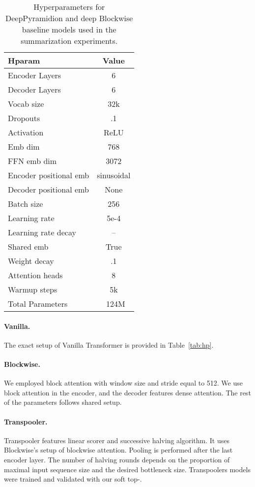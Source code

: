 \documentclass{article}
\begin{document}
{\begin{table}
\caption{Hyperparameters for DeepPyramidion and deep Blockwise baseline models used in the summarization experiments.}
\label{tab:hp_deep}
\centering
\begin{tabular}{lc}
    \toprule
    Hparam & Value \\
    \midrule
    Encoder Layers & 6 \\
    Decoder Layers & 6 \\
    Vocab size & 32k \\
    Dropouts  & .1    \\
    Activation & ReLU \\
    Emb dim & 768 \\
    FFN emb dim & 3072  \\
    Encoder positional emb & sinusoidal \\
    Decoder positional emb & None \\
    Batch size          & 256 \\
    Learning rate       & 5e-4 \\
    Learning rate decay & -- \\
    Shared emb & True \\
    Weight decay        & .1 \\
    Attention heads & 8 \\
    Warmup steps & 5k \\
    Total Parameters & ~124M \\
    \bottomrule
\end{tabular}
\end{table}


\paragraph{Vanilla.}
The exact setup of Vanilla Transformer is provided in Table~\ref{tab:hp}.

\paragraph{Blockwise.}
We employed block attention with window size and stride equal to 512. We use block attention in the encoder, and the decoder features dense attention.
The rest of the parameters follows shared setup.

\paragraph{Transpooler.}
Transpooler features linear scorer and successive halving algorithm. It uses Blockwise's setup of blockwise attention. Pooling is performed after the last encoder layer.
The number of halving rounds depends on the proportion of maximal input sequence size and the desired bottleneck size.
Transpoolers models were trained and validated with our soft top-.

}
\end{document}
